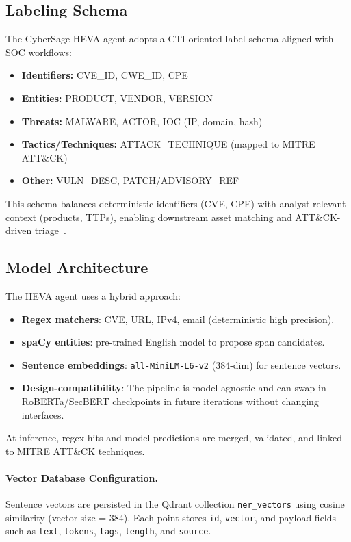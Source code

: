 \subsection{Labeling Schema}
The CyberSage-HEVA agent adopts a CTI-oriented label schema aligned with SOC workflows:
\begin{itemize}
    \item \textbf{Identifiers:} CVE\_ID, CWE\_ID, CPE
    \item \textbf{Entities:} PRODUCT, VENDOR, VERSION
    \item \textbf{Threats:} MALWARE, ACTOR, IOC (IP, domain, hash)
    \item \textbf{Tactics/Techniques:} ATTACK\_TECHNIQUE (mapped to MITRE ATT\&CK)
    \item \textbf{Other:} VULN\_DESC, PATCH/ADVISORY\_REF
\end{itemize}
This schema balances deterministic identifiers (CVE, CPE) with analyst-relevant context (products, TTPs), enabling downstream asset matching and ATT\&CK-driven triage~\cite{mitre2025attack, mitre2025cve}.

\subsection{Model Architecture}
The HEVA agent uses a hybrid approach:
\begin{itemize}
  \item \textbf{Regex matchers}: CVE, URL, IPv4, email (deterministic high precision).
  \item \textbf{spaCy entities}: pre-trained English model to propose span candidates.
  \item \textbf{Sentence embeddings}: \texttt{all-MiniLM-L6-v2} (384-dim) for sentence vectors.
  \item \textbf{Design-compatibility}: The pipeline is model-agnostic and can swap in RoBERTa/SecBERT checkpoints in future iterations without changing interfaces.
\end{itemize}

At inference, regex hits and model predictions are merged, validated, and linked to MITRE ATT\&CK techniques.

\paragraph{Vector Database Configuration.}
Sentence vectors are persisted in the Qdrant collection \texttt{ner\_vectors} using cosine similarity (vector size = 384).  
Each point stores \texttt{id}, \texttt{vector}, and payload fields such as \texttt{text}, \texttt{tokens}, \texttt{tags}, \texttt{length}, and \texttt{source}.

